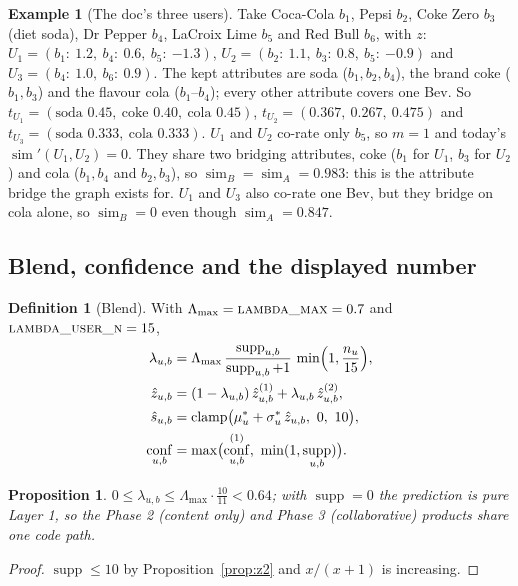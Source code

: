 \documentclass[11pt]{article}
\DeclareMathOperator{\clamp}{clamp}
\DeclareMathOperator{\simi}{sim}
\DeclareMathOperator{\conf}{conf}
\DeclareMathOperator{\supp}{supp}
\newcommand{\zhat}{\hat{z}}
\newcommand{\shat}{\hat{s}}
\theoremstyle{plain}
\newtheorem{proposition}[theorem]{Proposition}
\theoremstyle{definition}
\newtheorem{definition}[theorem]{Definition}
\newtheorem{example}[theorem]{Example}
\theoremstyle{remark}
\begin{document}
\begin{example}[The doc's three users]\label{ex:taste}
Take Coca-Cola $b_1$, Pepsi $b_2$, Coke Zero $b_3$ (diet soda), Dr Pepper $b_4$, LaCroix Lime $b_5$ and Red Bull $b_6$, with $z$: $U_1 = (b_1{:}\ 1.2,\ b_4{:}\ 0.6,\ b_5{:}\ {-1.3})$, $U_2 = (b_2{:}\ 1.1,\ b_3{:}\ 0.8,\ b_5{:}\ {-0.9})$ and $U_3 = (b_4{:}\ 1.0,\ b_6{:}\ 0.9)$. The kept attributes are soda ($b_1, b_2, b_4$), the brand coke ($b_1, b_3$) and the flavour cola ($b_1$--$b_4$); every other attribute covers one Bev. So $t_{U_1} = (\text{soda } 0.45,\ \text{coke } 0.40,\ \text{cola } 0.45)$, $t_{U_2} = (0.367,\ 0.267,\ 0.475)$ and $t_{U_3} = (\text{soda } 0.333,\ \text{cola } 0.333)$.
$U_1$ and $U_2$ co-rate only $b_5$, so $m = 1$ and today's $\simi'(U_1, U_2) = 0$. They share two bridging attributes, coke ($b_1$ for $U_1$, $b_3$ for $U_2$) and cola ($b_1, b_4$ and $b_2, b_3$), so $\simi_B = \simi_A = 0.983$: this is the attribute bridge the graph exists for.
$U_1$ and $U_3$ also co-rate one Bev, but they bridge on cola alone, so $\simi_B = 0$ even though $\simi_A = 0.847$.
\end{example}

\subsection{Blend, confidence and the displayed number}

\begin{definition}[Blend]\label{def:blend}
With $\Lambda_{\max} = \textsc{lambda\_max} = 0.7$ and $\textsc{lambda\_user\_n} = 15$,
\begin{align}
\lambda_{u,b} &= \Lambda_{\max}\, \frac{\supp_{u,b}}{\supp_{u,b} + 1}\, \min\Bigl(1, \frac{n_u}{15}\Bigr), \label{eq:lambda}\\
\zhat_{u,b} &= (1 - \lambda_{u,b})\, \zhat^{(1)}_{u,b} + \lambda_{u,b}\, \zhat^{(2)}_{u,b}, \label{eq:zblend}\\
\shat_{u,b} &= \clamp\bigl(\mu^\ast_u + \sigma^\ast_u\, \zhat_{u,b},\ 0,\ 10\bigr), \label{eq:shat}\\
\conf_{u,b} &= \max\bigl(\conf^{(1)}_{u,b},\ \min(1, \supp_{u,b})\bigr). \label{eq:conf}
\end{align}
\end{definition}

\begin{proposition}
$0 \le \lambda_{u,b} \le \Lambda_{\max}\cdot \tfrac{10}{11} < 0.64$; with $\supp = 0$ the prediction is pure Layer 1, so the Phase 2 (content only) and Phase 3 (collaborative) products share one code path.
\end{proposition}
\begin{proof}
$\supp \le 10$ by Proposition~\ref{prop:z2} and $x/(x+1)$ is increasing.
\end{proof}
\end{document}
